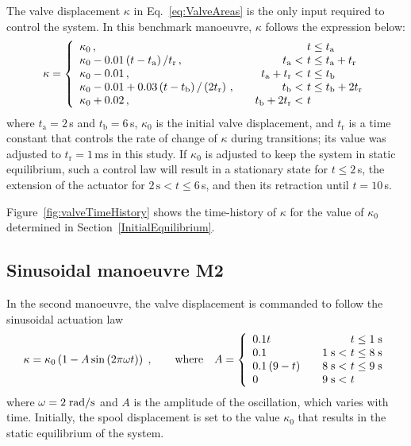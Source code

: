 \documentclass[fleqn,11pt]{article}
\newcommand{\unit}[1]		{ {\; \rm #1} }
\newcommand{\plbr}[1]{ \left( #1 \right) }
\newcommand{\lcubr}[1]{ \left\{ #1 \right.}
\newcommand{\matrArray}[2]{ \begin{array}{ #1 } #2 \end{array} }
\begin{document}
The valve displacement $\kappa$ in Eq.~\eqref{eq:ValveAreas} is the only input required to control the system. 
In this benchmark manoeuvre, $\kappa$ follows the expression below:
\begin{equation}
	\kappa = \lcubr{\matrArray {l@{\qquad}r@{\ }l} {
			\kappa_0\,,                                                  &                               & t \leq t_\text{a}    \\
			\kappa_0 - 0.01\plbr{t-t_\text{a}}/t_{\text{r}}\,,           & t_\text{a} <                  & t \leq t_\text{a} + t_{\text{r}}  \\
			\kappa_0 - 0.01\,,                                           & t_\text{a} + t_{\text{r}} <   & t \leq t_\text{b} \\
			\kappa_0 - 0.01 + 0.03\plbr{t-t_\text{b}}/\plbr{2t_{\text{r}}} \,,  & t_\text{b} <           & t \leq t_\text{b} + 2t_{\text{r}}  \\
			\kappa_0 + 0.02\,,                                           & t_\text{b} + 2t_{\text{r}} <  & t 
	}}
	\label{eq:timeHistoryValve}
\end{equation}
where $t_\text{a} =2$\,s and $t_\text{b} = 6$\,s,  $\kappa_0$ is the initial valve displacement, and $t_{\text{r}}$ is a time constant that controls the rate of change of $\kappa$ during transitions; its value was adjusted to $t_{\text{r}}=1$\,ms in this study.
If $\kappa_0$ is adjusted to keep the system in static equilibrium, such a control law will result in a stationary state for $t \leq 2$\,s, the extension of the actuator for $2\,\text{s} < t \leq 6$\,s, and then its retraction until $t = 10$\,s.

Figure~\ref{fig:valveTimeHistory} shows the time-history of $\kappa$ for the value of $\kappa_0$ determined in Section~\ref{InitialEquilibrium}.


\subsection{Sinusoidal manoeuvre M2}
\label{ManoeuvreSinusoidal}

In the second manoeuvre, the valve displacement is commanded to follow the sinusoidal actuation law
%
\begin{equation}
	\kappa = \kappa_0 \plbr{1 - A \sin\plbr{2\pi\omega t}}\; , \quad\quad
	{\rm where}\quad
	A = \lcubr{\matrArray{l@{\qquad}r@{\ }l}{
			0.1 t  			& &t \leq 1\unit{s}  \\
			0.1 			& 1\unit{s} < &t \leq 8\unit{s} \\
			0.1 \plbr{9-t} 	& 8\unit{s} < &t \leq 9\unit{s} \\
			0 				& 9\unit{s} < &t
	}}
	\label{eq:timeHistoryValveSinusoidal}
\end{equation}
%
where $\omega = 2\unit{rad/s}$ and $A$ is the amplitude of the oscillation, which varies with time.
Initially, the spool displacement is set to the value $\kappa_0$ that results in the static equilibrium of the system.
\end{document}
